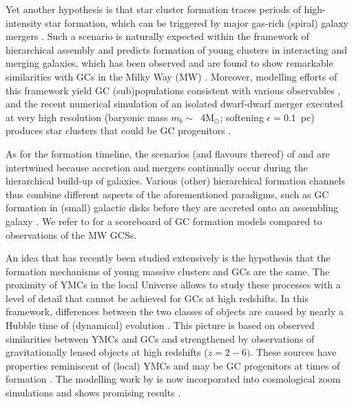 \documentclass[a4paper,fleqn,usenatbib]{mnras}
\newcommand{\Sun}[0]{\ensuremath{_{\odot}}}
\begin{document}
Yet another hypothesis is that star cluster formation traces periods of high-intensity
star formation, which can be triggered by major gas-rich (spiral) galaxy mergers 
\citep{1987nngp.proc...18S, 1992ApJ...384...50A}. Such a scenario is naturally 
expected within the framework of hierarchical assembly and predicts formation 
of young clusters in interacting and merging galaxies, which has been observed 
and are found to show remarkable similarities with GCs in the Milky Way (MW) \citep[e.g.][]{
1995AJ....109..960W, 1996AJ....112..416H, 1999AJ....118..752Z, 1999AJ....118.1551W}.
Moreover, modelling efforts of this framework yield GC (sub)populations consistent 
with various observables \citep[e.g.][]{2010ApJ...718.1266M, 2018MNRAS.480.2343C}, 
and the recent numerical simulation of an isolated dwarf-dwarf merger executed at 
very high resolution (baryonic mass $m_b \sim$~4M\Sun; softening $\epsilon = 0.1$~pc) 
produces star clusters that could be GC progenitors \citep{2019ApJ...879L..18L}.

As for the formation timeline, the scenarios (and flavours thereof) of \citet{
1985ApJ...298...18F} and \citet{1992ApJ...384...50A} are intertwined because
accretion and mergers continually occur during the hierarchical build-up of
galaxies. Various (other) hierarchical formation channels thus combine different
aspects of the aforementioned paradigms, such as GC formation in (small) galactic
disks before they are accreted onto an assembling galaxy \citep[e.g.][]{
2000ApJ...533..869C, 2002ApJ...567..853C, 2002MNRAS.333..383B, 2003egcs.conf..224G}. 
We refer to \citet{2001astro.ph..8034G} for a scoreboard of GC formation models 
compared to observations of the MW GCSs.

An idea that has recently been studied extensively is the hypothesis that the formation
mechanisms of young massive clusters \citep[YMCs, see][for a review]{2010ARA&A..48..431P} 
and GCs are the same. The proximity of YMCs in the local Universe allows to study these 
processes with a level of detail that cannot be achieved for GCs at high redshifts. In 
this framework, differences between the two classes of objects are caused by nearly a 
Hubble time of (dynamical) evolution \citep[e.g.][]{1987degc.book.....S}. This picture 
is based on observed similarities between YMCs and GCs
\citep[e.g.][]{1992AJ....103..691H,1999AJ....118.1551W} and strengthened by observations
of gravitationally lensed objects at high redshifts ($z = 2-6)$. These sources have 
properties reminiscent of (local) YMCs and may be GC progenitors at times of formation 
\citep{2017MNRAS.467.4304V,2017ApJ...843L..21J}. The modelling work by 
\citet{2011MNRAS.414.1339K,2012MNRAS.421.1927K,2015MNRAS.454.1658K} is now 
incorporated into cosmological zoom simulations and shows promising results
\citep{2018MNRAS.475.4309P,2019MNRAS.486.3134K}.
\end{document}
